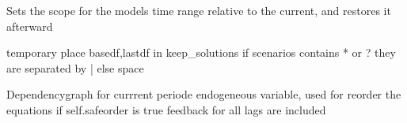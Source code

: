 \documentclass[letterpaper,10pt,english]{sphinxmanual}
\begin{document}
\begin{fulllineitems}
\begin{fulllineitems}
\begin{quote}
\begin{description}
\begin{itemize}
\end{itemize}

\end{description}\end{quote}

\end{fulllineitems}


\begin{fulllineitems}
\label{\detokenize{index:modelclass.BaseModel.set_smpl_relative}}
\pysigstartsignatures
{}
\pysigstopsignatures
\sphinxAtStartPar
Sets the scope for the models time range relative to the current, and restores it afterward

\end{fulllineitems}


\begin{fulllineitems}
\label{\detokenize{index:modelclass.BaseModel.keepswitch}}
\pysigstartsignatures
{}
\pysigstopsignatures
\sphinxAtStartPar
temporary place basedf,lastdf in keep\_solutions
if scenarios contains * or ? they are separated by | else space

\end{fulllineitems}


\begin{fulllineitems}
\label{\detokenize{index:modelclass.BaseModel.endograph}}
\pysigstartsignatures
{}
\pysigstopsignatures
\sphinxAtStartPar
Dependencygraph for currrent periode endogeneous variable, used for reorder the equations
if self.safeorder is true feedback for all lags are included


\end{fulllineitems}
\end{fulllineitems}
\end{document}
